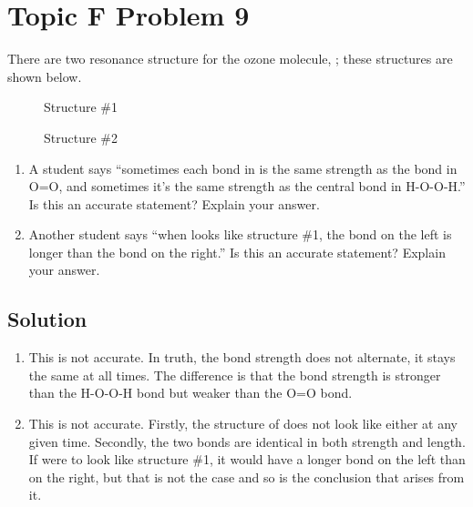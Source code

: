 \documentclass[10pt]{article}
\begin{document}
    \section{Topic F Problem 9}
        There are two resonance structure for the ozone molecule, ; these structures are shown below.
        \begin{center}
            \begin{multicols}{2}
                \begin{figure}[H]
                    \centering
                    \caption{Structure \#1}
                \end{figure}
                
                \begin{figure}[H]
                    \centering
                    \caption{Structure \#2}
                \end{figure}
            \end{multicols}
        \end{center}

        \begin{enumerate}[label=\alph*)]
            \item   A student says “sometimes each bond in  is the same strength as the bond in O=O, and sometimes it's the same strength as the central bond in H-O-O-H.” 
                Is this an accurate statement? 
                Explain your answer.
            \item   Another student says “when  looks like structure \#1, the bond on the left is longer than the bond on the right.” 
                Is this an accurate statement? 
                Explain your answer.
        \end{enumerate}
        
        \subsection{Solution}
            \begin{enumerate}[label=\alph*/]
                \item   This is not accurate. In truth, the bond strength does not alternate, it stays the same at all times. The difference is that the bond strength is stronger than the H-O-O-H bond but weaker than the O=O bond.
                \item   This is not accurate. Firstly, the structure of  does not look like either at any given time. Secondly, the two bonds are identical in both strength and length. If  were to look like structure \#1, it would have a longer bond on the left than on the right, but that is not the case and so is the conclusion that arises from it.
            \end{enumerate}
\end{document}
